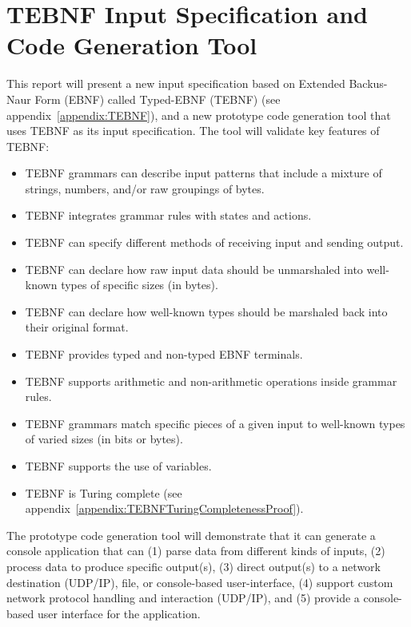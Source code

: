 \section{TEBNF Input Specification and Code Generation Tool}
This report will present a new input specification based on Extended Backus-Naur Form (EBNF) called Typed-EBNF (TEBNF) (see appendix~\ref{appendix:TEBNF}), and a new prototype code generation tool that uses TEBNF as its input specification.  The tool will validate key features of TEBNF:
\begin{itemize}
  \item TEBNF grammars can describe input patterns that include a mixture of strings, numbers, and/or raw groupings of bytes.
  \item TEBNF integrates grammar rules with states and actions.
  \item TEBNF can specify different methods of receiving input and sending output.
  \item TEBNF can declare how raw input data should be unmarshaled into well-known types of specific sizes (in bytes).
  \item TEBNF can declare how well-known types should be marshaled back into their original format.
  \item TEBNF provides typed and non-typed EBNF terminals.
  \item TEBNF supports arithmetic and non-arithmetic operations inside grammar rules.
  \item TEBNF grammars match specific pieces of a given input to well-known types of varied sizes (in bits or bytes).
  \item TEBNF supports the use of variables.
  \item TEBNF is Turing complete (see appendix~\ref{appendix:TEBNFTuringCompletenessProof}).
\end{itemize}

\indent
The prototype code generation tool will demonstrate that it can generate a console application that can (1) parse data from different kinds of inputs, (2) process data to produce specific output(s), (3) direct output(s) to a network destination (UDP/IP), file, or console-based user-interface, (4) support custom network protocol handling and interaction (UDP/IP), and (5) provide a console-based user interface for the application.
